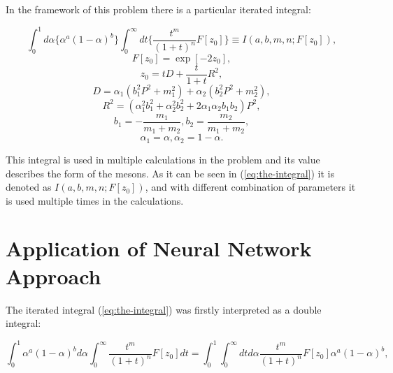 \documentclass[%
]{ittmm}
\begin{document}
In the framework of this problem there is a particular iterated integral:

\begin{equation}
    \label{eq:the-integral}
    \int_{0}^{1}d\alpha\{\alpha^{a}(1 - \alpha)^b\}\int_{0}^{\infty}dt\{\frac{t^m}{(1+t)^n}F[z_{0}]\} \equiv I(a, b, m, n; F[z_{0}]),
\end{equation}
\begin{equation*}   
    F[z_0] = \exp[-2z_0],
\end{equation*}
\begin{equation*} 
    z_0 = tD + \frac{t}{1 + t}R^2,
\end{equation*}
\begin{equation*}     
    D = \alpha_1(b_1^{2}P^2 + m_1^2) + \alpha_2(b_2^{2}P^2 + m_2^2),
\end{equation*}
\begin{equation*} 
        R^2 = (\alpha_1^{2}b_1^2 + \alpha_2^{2}b_2^2 + 2\alpha_{1}\alpha_{2}b_{1}b_2)P^2,
\end{equation*}
\begin{equation*} 
    b_1 = -\frac{m_1}{m_1 + m_2},
    b_2 = \frac{m_2}{m_1 + m_2},
\end{equation*}
\begin{equation*}
    \alpha_1 = \alpha, \alpha_2 = 1 - \alpha.
\end{equation*}


\noindent This integral is used in multiple calculations in the problem and its value describes the form of the mesons. 
As it can be seen in (\ref{eq:the-integral}) it is denoted as $I(a, b, m, n; F[z_{0}])$, and with different combination of parameters it is used multiple times in the calculations.

\section{Application of Neural Network Approach}

The iterated integral (\ref{eq:the-integral}) was firstly interpreted as a double integral:

\begin{equation}
    \label{eq:iterated-as-double}
     \int_{0}^{1} \alpha^{a}(1 - \alpha)^bd\alpha \int_{0}^{\infty}\frac{t^m}{(1+t)^n}F[z_{0}]dt = 
     \int_{0}^{1} \int_{0}^{\infty} dtd\alpha \frac{t^m}{(1+t)^n}F[z_{0}]\alpha^{a}(1 - \alpha)^b,
\end{equation}
\end{document}
